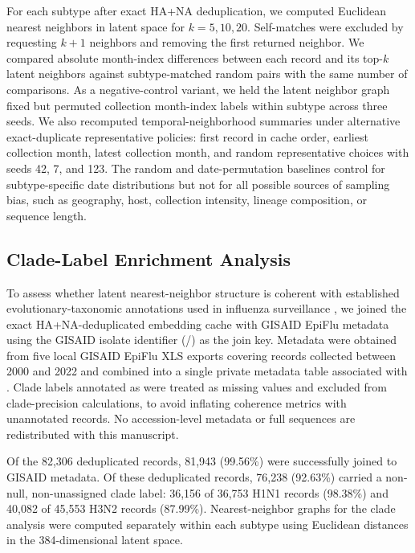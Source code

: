 \documentclass[11pt]{article}
\begin{document}
For each subtype after exact HA+NA deduplication, we computed Euclidean nearest neighbors in latent space for $k=5,10,20$. Self-matches were excluded by requesting $k+1$ neighbors and removing the first returned neighbor. We compared absolute month-index differences between each record and its top-$k$ latent neighbors against subtype-matched random pairs with the same number of comparisons. As a negative-control variant, we held the latent neighbor graph fixed but permuted collection month-index labels within subtype across three seeds. We also recomputed temporal-neighborhood summaries under alternative exact-duplicate representative policies: first record in cache order, earliest collection month, latest collection month, and random representative choices with seeds 42, 7, and 123. The random and date-permutation baselines control for subtype-specific date distributions but not for all possible sources of sampling bias, such as geography, host, collection intensity, lineage composition, or sequence length.

\subsection{Clade-Label Enrichment Analysis}

To assess whether latent nearest-neighbor structure is coherent with established evolutionary-taxonomic annotations used in influenza surveillance \cite{hadfield2018nextstrain}, we joined the exact HA+NA-deduplicated embedding cache with GISAID EpiFlu metadata using the GISAID isolate identifier (/) as the join key. Metadata were obtained from five local GISAID EpiFlu XLS exports covering records collected between 2000 and 2022 and combined into a single private metadata table associated with . Clade labels annotated as  were treated as missing values and excluded from clade-precision calculations, to avoid inflating coherence metrics with unannotated records. No accession-level metadata or full sequences are redistributed with this manuscript.

Of the 82,306 deduplicated records, 81,943 (99.56\%) were successfully joined to GISAID metadata. Of these deduplicated records, 76,238 (92.63\%) carried a non-null, non-unassigned clade label: 36,156 of 36,753 H1N1 records (98.38\%) and 40,082 of 45,553 H3N2 records (87.99\%). Nearest-neighbor graphs for the clade analysis were computed separately within each subtype using Euclidean distances in the 384-dimensional latent space.
\end{document}
